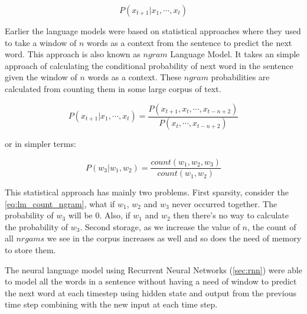 \begin{equation}
    \label{eq:lm_dist}
        P(x_{t+1}|x_{1}, \cdots, x_{t})
\end{equation}

Earlier the language models were based on statistical approaches where they used to take a window of $n$ words as a context from the sentence to predict the next word. This approach is also known as $ngram$ Language Model. It takes an simple approach of calculating the conditional probability of next word in the sentence given the window of $n$ words as a context. These $ngram$ probabilities are calculated from counting them in some large corpus of text.

\begin{equation}
    \label{eq:lm_ngram}
        P(x_{t+1}|x_{1}, \cdots, x_{t}) = 
            \frac {P(x_{t+1}, x_{t}, \cdots, x_{t-n+2})} {P(x_{t}, \cdots, x_{t-n+2})}
\end{equation}

or in simpler terms:

\begin{equation}
    \label{eq:lm_count_ngram}
        P(w_{3}|w_{1},w_{2}) = \frac{count(w_{1}, w_{2}, w_{3})}{count(w_{1}, w_{2})}
\end{equation}

This statistical approach has mainly two problems. First sparsity, consider the \cref{eq:lm_count_ngram}, what if $w_{1}$, $w_{2}$ and $w_{3}$ never occurred together. The probability of $w_{3}$ will be 0. Also, if $w_{1}$ and $w_{2}$ then there's no way to calculate the probability of $w_{3}$. Second storage, as we increase the value of $n$, the count of all $nrgams$ we see in the corpus increases as well and so does the need of memory to store them.

The neural language model using Recurrent Neural Networks (\cref{sec:rnn}) were able to model all the words in a sentence without having a need of window to predict the next word at each timestep using hidden state and output from the previous time step combining with the new input at each time step. 



